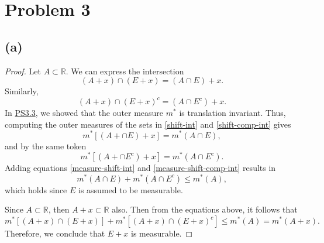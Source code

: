 \documentclass{article}
\begin{document}
\section*{Problem 3}
\subsection*{(a)}
\begin{proof}
	Let $A \subset \mathbb{R}$. We can express the intersection
	\begin{equation}\label{shift-int}
		(A+x) \cap (E+x) = (A\cap E) + x.
	\end{equation}
	Similarly,
	\begin{equation}\label{shift-comp-int}
		(A+x) \cap (E+x)^c = (A\cap E^c) + x.
	\end{equation}
	In \href{https://github.com/ovega14/FunctionalAnalysis_solutions/blob/main/PS3/18.102_ps3.pdf}{PS3.3}, we showed that the outer measure $m^*$ is translation invariant. Thus, computing the outer measures of the sets in \eqref{shift-int} and \eqref{shift-comp-int} gives
	\begin{equation}\label{measure-shift-int}
		m^*\left[(A+\cap E) + x\right] = m^*(A\cap E),
	\end{equation}
	and by the same token
	\begin{equation}\label{measure-shift-comp-int}
		m^*\left[(A+\cap E^c) + x\right] = m^*(A\cap E^c).
	\end{equation}
	Adding equations \eqref{measure-shift-int} and \eqref{measure-shift-comp-int} results in 
	\begin{equation}
		m^*(A\cap E) + m^*(A\cap E^c) \leq m^*(A),
	\end{equation}
	which holds since $E$ is assumed to be measurable.
	
	Since $A \subset \mathbb{R}$, then $A + x \subset \mathbb{R}$ also. Then from the equations above, it follows that
	\begin{equation}
		m^*\left[(A+x) \cap (E+x)\right] + m^*\left[(A+x) \cap (E+x)^c\right] \leq m^*(A) = m^*(A+x).
	\end{equation}
	Therefore, we conclude that $E+x$ is measurable. 
\end{proof}
\end{document}
